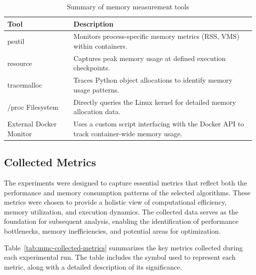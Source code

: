 \begin{table}[h]
    \centering
    \begin{tabular}{|l|p{7cm}|}
        \hline
        \textbf{Tool}                       & \textbf{Description}                                                                       \\ \hline
        psutil~\cite{psutil}                & Monitors process-specific memory metrics (\ac{RSS}, \ac{VMS}) within containers.           \\ \hline
        resource~\cite{importlib_resources} & Captures peak memory usage at defined execution checkpoints.                               \\ \hline
        tracemalloc~\cite{tracemalloc}      & Traces Python object allocations to identify memory usage patterns.                        \\ \hline
        /proc Filesystem~\cite{procfs}      & Directly queries the Linux kernel for detailed memory allocation data.                     \\ \hline
        External Docker Monitor             & Uses a custom script interfacing with the Docker API to track container-wide memory usage. \\ \hline
    \end{tabular}
    \caption{Summary of memory measurement tools}
    \label{tab:mmc-memory-measurement-tools}
\end{table}

\subsection{Collected Metrics}
\label{subsec:mmc-collected-metrics}

The experiments were designed to capture essential metrics that reflect both the performance and memory consumption patterns of the selected algorithms.
These metrics were chosen to provide a holistic view of computational efficiency, memory utilization, and execution dynamics.
The collected data serves as the foundation for subsequent analysis, enabling the identification of performance bottlenecks, memory inefficiencies, and potential areas for optimization.

Table~\ref{tab:mmc-collected-metrics} summarizes the key metrics collected during each experimental run.
The table includes the symbol used to represent each metric, along with a detailed description of its significance.

